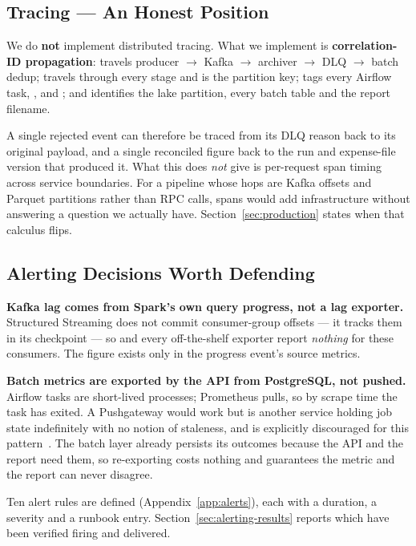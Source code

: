 \subsection{Tracing --- An Honest Position}
\label{sec:tracing}

We do \textbf{not} implement distributed tracing. What we implement is
\textbf{correlation-ID propagation}:  travels producer
$\rightarrow$ Kafka $\rightarrow$ archiver $\rightarrow$ DLQ
$\rightarrow$ batch dedup;  travels through every stage
and is the partition key;  tags every Airflow task,
,  and ;
and  identifies the lake partition, every batch table and
the report filename.

A single rejected event can therefore be traced from its DLQ reason back
to its original payload, and a single reconciled figure back to the run
and expense-file version that produced it. What this does \emph{not} give
is per-request span timing across service boundaries. For a pipeline
whose hops are Kafka offsets and Parquet partitions rather than RPC
calls, spans would add infrastructure without answering a question we
actually have. Section~\ref{sec:production} states when that calculus
flips.

\subsection{Alerting Decisions Worth Defending}
\label{sec:impl-alerting}

\textbf{Kafka lag comes from Spark's own query progress, not a lag
exporter.} Structured Streaming does not commit consumer-group offsets
--- it tracks them in its checkpoint --- so 
and every off-the-shelf exporter report \emph{nothing} for these
consumers. The figure exists only in the progress event's source metrics.

\textbf{Batch metrics are exported by the API from PostgreSQL, not
pushed.} Airflow tasks are short-lived processes; Prometheus pulls, so by
scrape time the task has exited. A Pushgateway would work but is another
service holding job state indefinitely with no notion of staleness, and
is explicitly discouraged for this pattern~\cite{prometheus_docs}. The
batch layer already persists its outcomes because the API and the report
need them, so re-exporting costs nothing and guarantees the metric and
the report can never disagree.

Ten alert rules are defined (Appendix~\ref{app:alerts}), each with a
 duration, a severity and a runbook entry.
Section~\ref{sec:alerting-results} reports which have been verified
firing and delivered.
